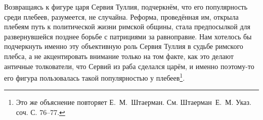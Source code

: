 

Возвращаясь к фигуре царя Сервия Туллия, подчеркнём, что его популярность среди плебеев, разумеется, не случайна. Реформа, проведённая им, открыла плебеям путь к политической жизни римской общины, стала предпосылкой для развернувшейся позднее борьбе с патрициями за равноправие. Нам хотелось бы подчеркнуть именно эту объективную роль Сервия Туллия в судьбе римского плебса, а не акцентировать внимание только на том факте, как это делают античные толкователи, что Сервий из раба сделался царём, и именно поэтому-то его фигура пользовалась такой популярностью у плебеев\footnote{Это же объяснение повторяет Е.~М.~Штаерман. См. Штаерман~Е.~М. Указ. соч. С. 76--77.}.

